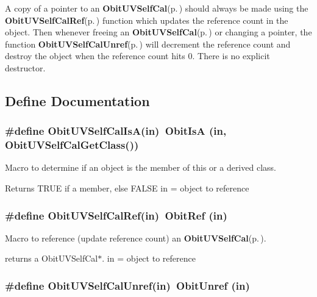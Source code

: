 A copy of a pointer to an {\bf Obit\-UVSelf\-Cal}{\rm (p.\,\pageref{structObitUVSelfCal})} should always be made using the {\bf Obit\-UVSelf\-Cal\-Ref}{\rm (p.\,\pageref{ObitUVSelfCal_8h_a1})} function which updates the reference count in the object. Then whenever freeing an {\bf Obit\-UVSelf\-Cal}{\rm (p.\,\pageref{structObitUVSelfCal})} or changing a pointer, the function {\bf Obit\-UVSelf\-Cal\-Unref}{\rm (p.\,\pageref{ObitUVSelfCal_8h_a0})} will decrement the reference count and destroy the object when the reference count hits 0. There is no explicit destructor.

\subsection{Define Documentation}
\subsubsection{\setlength{\rightskip}{0pt plus 5cm}\#define Obit\-UVSelf\-Cal\-Is\-A(in)\ Obit\-Is\-A (in, Obit\-UVSelf\-Cal\-Get\-Class())}\label{ObitUVSelfCal_8h_a2}


Macro to determine if an object is the member of this or a derived class. 

Returns TRUE if a member, else FALSE in = object to reference 
\subsubsection{\setlength{\rightskip}{0pt plus 5cm}\#define Obit\-UVSelf\-Cal\-Ref(in)\ Obit\-Ref (in)}\label{ObitUVSelfCal_8h_a1}


Macro to reference (update reference count) an {\bf Obit\-UVSelf\-Cal}{\rm (p.\,\pageref{structObitUVSelfCal})}. 

returns a Obit\-UVSelf\-Cal$\ast$. in = object to reference 
\subsubsection{\setlength{\rightskip}{0pt plus 5cm}\#define Obit\-UVSelf\-Cal\-Unref(in)\ Obit\-Unref (in)}\label{ObitUVSelfCal_8h_a0}


